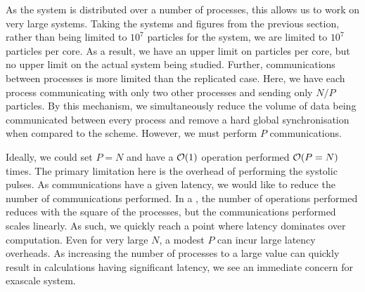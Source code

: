 %
As the system is distributed over a number of processes, this allows
us to work on very large systems.
%
Taking the systems and figures from the previous section,
rather than being limited to $10^7$ particles for the system,
we are limited to $10^7$ particles per core.
%
As a result, we have an upper limit on particles per core, but no
upper limit on the actual system being studied.
%
Further, communications between processes is more limited than the
replicated case.
%
Here, we have each process communicating with only two other processes
and sending only $N/P$ particles.
%
By this mechanism, we simultaneously reduce the volume of data
being communicated between every process and
remove a hard global synchronisation
when compared to the \replicateddata{} scheme.
%
However, we must perform $P$ communications.

Ideally, we could set $P = N$ and have a $\mathcal{O}{\left({ 1 }\right)}$ operation performed
$\mathcal{O}{\left({ P = N }\right)}$ times.
%
The primary limitation here is the overhead of performing the systolic
pulses.
%
As communications have a given latency, we would like to reduce the number
of communications performed.
%
In a \systolicloop{}, the number of operations performed reduces with
the square of the processes, but the communications performed scales linearly.
%
As such, we quickly reach a point where latency dominates over computation.
%
Even for very large $N$, a modest $P$ can incur large latency overheads.
%
As increasing the number of processes to a large value
can quickly result in calculations having significant latency,
we see an immediate concern for exascale system.
